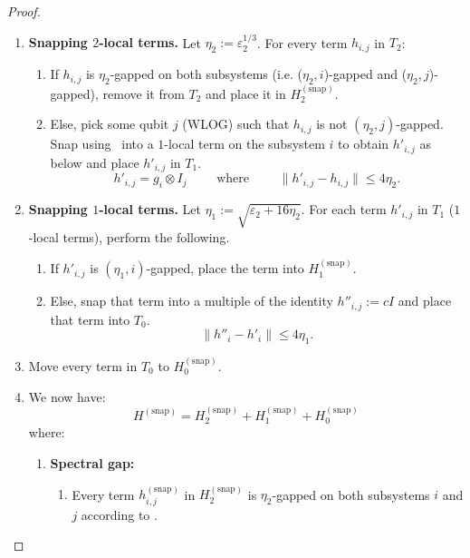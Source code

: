 \documentclass[11pt]{article}
\theoremstyle{plain}
\newcommand{\eps}{\varepsilon}
\newcommand{\AnandNote}[1]{\textcolor{red}{(Anand: #1)}}
\newcommand{\IslamNote}[1]{\textcolor{orange}{(Islam: #1)}}
\newcommand{\AnandNote}[1]{}
\newcommand{\IslamNote}[1]{}
\newcommand{\snp}{{(\mathrm{snap})}}
\begin{document}
\begin{proof}
\begin{enumerate}
    Let $\eps_2 = \eps$.
    \item \textbf{Snapping $2$-local terms.} Let $\eta_2 := \eps_2^{1/3}$. For every term $h_{i, j}$ in $T_2$:
    \begin{enumerate}
        \item If $h_{i, j}$ is $\eta_2$-gapped on both subsystems (i.e. ($\eta_2, i$)-gapped and ($\eta_2, j$)-gapped), remove it from $T_2$ and place it in $H^\snp_2$.
        \item Else, pick some qubit $j$ (WLOG) such that $h_{i, j}$ is not $(\eta_2, j)$-gapped. Snap using~ into a $1$-local term on the subsystem $i$ to obtain $h'_{i,j}$ as below and place $h'_{i,j}$ in $T_1$.
        \begin{equation}
        h'_{i,j} = g_i \otimes I_j  \quad\quad \text{ where }\quad\quad     \| h'_{i,j} - h_{i,j} \| \leq 4\eta_2.
        \end{equation}
    \end{enumerate}
    \item \textbf{Snapping $1$-local terms.} Let $\eta_1 := \sqrt{\eps_2 + 16\eta_2}$. For each term $h'_{i,j}$ in $T_1$ ($1$-local terms), perform the following.
    \begin{enumerate}
        \item If $h'_{i,j}$ is $(\eta_1, i)$-gapped, place the term into $H^\snp_1$.
        \item Else, snap that term into a multiple of the identity $h''_{i,j} := c I$ and place that term into $T_0$.
        \begin{equation}
            \|h''_i - h'_i\| \leq 4 \eta_1.
        \end{equation}
    \end{enumerate}
    \item Move every term in $T_0$ to $H^\snp_0$.
    \item We now have:
    \begin{equation}
        H^\snp = H^\snp_2 + H^\snp_1 + H^\snp_0
    \end{equation}
    where:
    \begin{enumerate}
    \item \textbf{Spectral gap:}
    \begin{enumerate}
        \item Every term $h_{i,j}^\snp$ in $H^\snp_2$ is $\eta_2$-gapped on both subsystems $i$ and $j$ according to .

\end{enumerate}
\end{enumerate}
\end{enumerate}
\end{proof}
\end{document}
